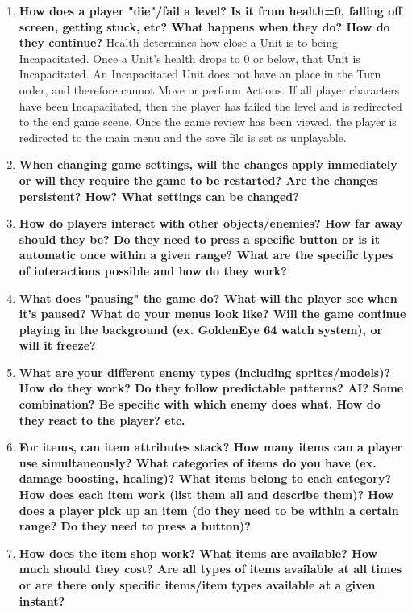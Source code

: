 \documentclass[12pt, titlepage]{article}
\begin{document}
\begin{enumerate}
	\item \textbf{How does a player "die"/fail a level? Is it from health=0, falling off screen, getting stuck, etc? What happens when they do? How do they continue?}
	Health determines how close a Unit is to being Incapacitated. Once a Unit’s health drops to 0 or below, that Unit is Incapacitated. An Incapacitated Unit does not have an place in the Turn order, and therefore cannot Move or perform Actions. If all player characters have been Incapacitated, then the player has failed the level and is redirected to the end game scene. Once the game review has been viewed, the player is redirected to the main menu and the save file is set as unplayable.
	\item \textbf{When changing game settings, will the changes apply immediately or will they require the game to be restarted? Are the changes persistent? How? What settings can be changed?}
	\item \textbf{How do players interact with other objects/enemies? How far away should they be? Do they need to press a specific button or is it automatic once within a given range? What are the specific types of interactions possible and how do they work?}
	\item \textbf{What does "pausing" the game do? What will the player see when it's paused? What do your menus look like? Will the game continue playing in the background (ex. GoldenEye 64 watch system), or will it freeze?}
	\item \textbf{What are your different enemy types (including sprites/models)? How do they work? Do they follow predictable patterns? AI? Some combination? Be specific with which enemy does what. How do they react to the player? etc.}
	\item \textbf{For items, can item attributes stack? How many items can a player use simultaneously? What categories of items do you have (ex. damage boosting, healing)? What items belong to each category? How does each item work (list them all and describe them)? How does a player pick up an item (do they need to be within a certain range? Do they need to press a button)?}
	\item \textbf{How does the item shop work? What items are available? How much should they cost? Are all types of items available at all times or are there only specific items/item types available at a given instant?}

\end{enumerate}
\end{document}
